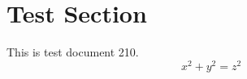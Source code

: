 \documentclass{article}
\begin{document}
\section{Test Section}
This is test document 210.
\begin{equation}
x^2 + y^2 = z^2
\end{equation}
\end{document}
